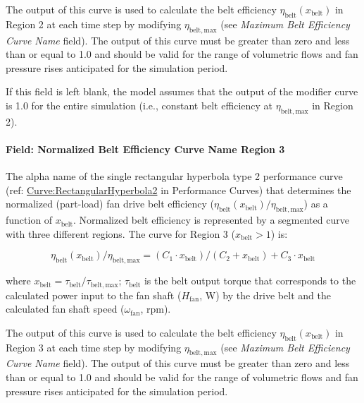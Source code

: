 The output of this curve is used to calculate the belt efficiency \(\eta_{\mathrm{belt}} (x_{\mathrm{belt}})\) in Region 2 at each time step by modifying \(\eta_{\mathrm{belt, max}}\) (see \emph{Maximum Belt Efficiency Curve Name} field). The output of this curve must be greater than zero and less than or equal to 1.0 and should be valid for the range of volumetric flows and fan pressure rises anticipated for the simulation period.

If this field is left blank, the model assumes that the output of the modifier curve is 1.0 for the entire simulation (i.e., constant belt efficiency at \(\eta_{\mathrm{belt, max}}\) in Region 2).

\paragraph{Field: Normalized Belt Efficiency Curve Name Region 3}\label{field-normalized-belt-efficiency-curve-name-region-3}

The alpha name of the single rectangular hyperbola type 2 performance curve (ref: \hyperref[curverectangularhyperbola2]{Curve:RectangularHyperbola2} in Performance Curves) that determines the normalized (part-load) fan drive belt efficiency (\(\eta_{\mathrm{belt}} (x_{\mathrm{belt}}) / \eta_{\mathrm{belt, max}}\)) as a function of \(x_{\mathrm{belt}}\). Normalized belt efficiency is represented by a segmented curve with three different regions. The curve for Region 3 (\(x_{\mathrm{belt}} > 1\)) is:

\begin{equation}
  \eta_{\mathrm{belt}} ( x_{\mathrm{belt}} ) / \eta_{\mathrm{belt, max}} = ( C_1 \cdot x_{\mathrm{belt}} ) / ( C_2 + x_{\mathrm{belt}} ) + C_3 \cdot x_{\mathrm{belt}}
\end{equation}

where \(x_{\mathrm{belt}} = \tau_{\mathrm{belt}} / \tau_{\mathrm{belt, max}}\); \(\tau_{\mathrm{belt}}\) is the belt output torque that corresponds to the calculated power input to the fan shaft (\(H_{\mathrm{fan}}\), W) by the drive belt and the calculated fan shaft speed (\(\omega_{\mathrm{fan}}\), rpm).

The output of this curve is used to calculate the belt efficiency \(\eta_{\mathrm{belt}} (x_{\mathrm{belt}})\) in Region 3 at each time step by modifying \(\eta_{\mathrm{belt, max}}\) (see \emph{Maximum Belt Efficiency Curve Name} field). The output of this curve must be greater than zero and less than or equal to 1.0 and should be valid for the range of volumetric flows and fan pressure rises anticipated for the simulation period.

